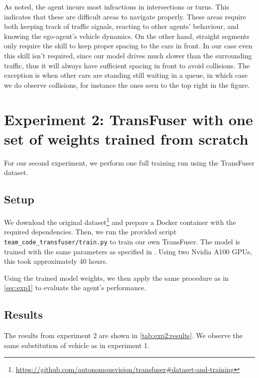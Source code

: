 As noted, the agent incurs most infractions in intersections or turns.
This indicates that these are difficult areas to navigate properly.
These areas require both keeping track of traffic signals,
reacting to other agents' behaviour,
and knowing the ego-agent's vehicle dynamics.
On the other hand,
straight segments only require the skill to keep proper spacing to the cars in front.
In our case even this skill isn't required,
since our model drives much slower than the surrounding traffic,
thus it will always have sufficient spacing in front to avoid collisions.
The exception is when other cars are standing still waiting in a queue,
in which case we do observe collisions,
for instance the ones seen to the top right in the figure.


\section{Experiment 2: TransFuser with one set of weights trained from scratch}
\label{sec:exp2}
For our second experiment,
we perform one full training run using the TransFuser dataset.

\subsection{Setup}
We download the original dataset\footnote{\url{https://github.com/autonomousvision/transfuser\#dataset-and-training}} and prepare a Docker container with the required dependencies.
Then, we run the provided script \texttt{team\_code\_transfuser/train.py} to train our own TransFuser.
The model is trained with the same parameters as specified in \cite{transfuser-pami}.
Using two Nvidia A100 GPUs, this took approximately 40 hours.

Using the trained model weights,
we then apply the same procedure as in \cref{sec:exp1}
to evaluate the agent's performance.


\subsection{Results}

The results from experiment 2 are shown in \cref{tab:exp2:results}.
We observe the same substitution of vehicle as in experiment 1.

